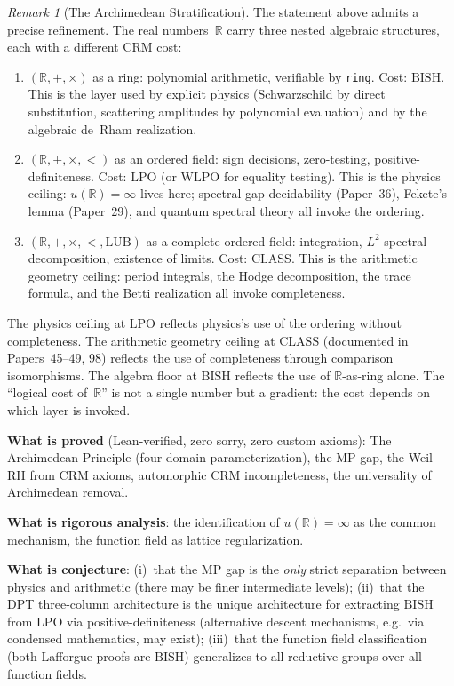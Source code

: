 \documentclass[11pt]{article}
\theoremstyle{definition}
\theoremstyle{remark}
\newtheorem{remark}[theorem]{Remark}
\newcommand{\R}{\mathbb{R}}
\newcommand{\BISH}{\mathrm{BISH}}
\newcommand{\LPO}{\mathrm{LPO}}
\newcommand{\WLPO}{\mathrm{WLPO}}
\newcommand{\MP}{\mathrm{MP}}
\newcommand{\CLASS}{\mathrm{CLASS}}
\begin{document}
\begin{remark}[The Archimedean Stratification]\label{rmk:stratification}
The statement above admits a precise refinement. The real numbers~$\R$ carry three nested algebraic structures, each with a different CRM cost:
\begin{enumerate}[label=(\roman*)]
\item $(\R, +, \times)$ as a ring: polynomial arithmetic, verifiable by \texttt{ring}. Cost: $\BISH$. This is the layer used by explicit physics (Schwarzschild by direct substitution, scattering amplitudes by polynomial evaluation) and by the algebraic de~Rham realization.
\item $(\R, +, \times, <)$ as an ordered field: sign decisions, zero-testing, positive-definiteness. Cost: $\LPO$ (or $\WLPO$ for equality testing). This is the physics ceiling: $u(\R) = \infty$ lives here; spectral gap decidability (Paper~36), Fekete's lemma (Paper~29), and quantum spectral theory all invoke the ordering.
\item $(\R, +, \times, <, \mathrm{LUB})$ as a complete ordered field: integration, $L^2$ spectral decomposition, existence of limits. Cost: $\CLASS$. This is the arithmetic geometry ceiling: period integrals, the Hodge decomposition, the trace formula, and the Betti realization all invoke completeness.
\end{enumerate}
The physics ceiling at $\LPO$ reflects physics's use of the ordering without completeness. The arithmetic geometry ceiling at $\CLASS$ (documented in Papers~45--49, 98) reflects the use of completeness through comparison isomorphisms. The algebra floor at $\BISH$ reflects the use of $\R$-as-ring alone. The ``logical cost of~$\R$'' is not a single number but a gradient: the cost depends on which layer is invoked.
\end{remark}

\medskip\noindent
\textbf{What is proved} (Lean-verified, zero sorry, zero custom axioms): The Archimedean Principle (four-domain parameterization), the MP gap, the Weil RH from CRM axioms, automorphic CRM incompleteness, the universality of Archimedean removal.

\textbf{What is rigorous analysis}: the identification of $u(\R) = \infty$ as the common mechanism, the function field as lattice regularization.

\textbf{What is conjecture}: (i)~that the $\MP$ gap is the \emph{only} strict separation between physics and arithmetic (there may be finer intermediate levels); (ii)~that the DPT three-column architecture is the unique architecture for extracting $\BISH$ from $\LPO$ via positive-definiteness (alternative descent mechanisms, e.g.\ via condensed mathematics, may exist); (iii)~that the function field classification (both Lafforgue proofs are $\BISH$) generalizes to all reductive groups over all function fields.
\end{document}
